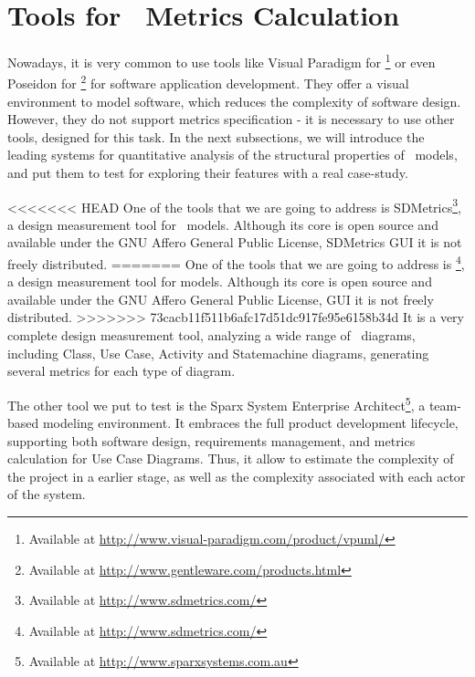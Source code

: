 \section{Tools for \uml\ Metrics Calculation} \label{tools}

Nowadays, it is very common to use tools like \textsf{Visual Paradigm for \uml\footnote{Available at \url{http://www.visual-paradigm.com/product/vpuml/}}} or even \textsf{Poseidon for \uml}\footnote{Available at \url{http://www.gentleware.com/products.html}} for software application development.
They offer a visual environment to model software, which reduces the complexity of software design.
However, they do not support metrics specification - it is necessary to use other tools, designed for this task.
In the next subsections, we will introduce the leading systems for quantitative analysis of the structural properties of \uml\ models, and put them to test for exploring their features with a real case-study.

<<<<<<< HEAD
One of the tools that we are going to address is SDMetrics\footnote{Available at \url{http://www.sdmetrics.com/}}, a design measurement tool for \uml\ models.
Although its core is open source and available under the GNU Affero General Public License, SDMetrics GUI it is not freely distributed. 
=======
One of the tools that we are going to address is \sdmetrics\footnote{Available at \url{http://www.sdmetrics.com/}}, a design measurement tool for \umlS models.
Although its core is open source and available under the GNU Affero General Public License, \sdmetricsS GUI it is not freely distributed. 
>>>>>>> 73cacb11f511b6afc17d51dc917fe95e6158b34d
It is a very complete design measurement tool, analyzing a wide range of \uml\ diagrams, including Class, Use Case, Activity and Statemachine diagrams, generating several metrics for each type of diagram.

The other tool we put to test is the \textsf{Sparx System Enterprise Architect}{\footnote{Available at \url{http://www.sparxsystems.com.au}}}, a team-based modeling environment. 
It embraces the full product development lifecycle, supporting both software design, requirements management, and metrics calculation for Use Case Diagrams.
Thus, it allow to estimate the complexity of the project in a earlier stage, as well as the complexity associated with each actor of the system.
